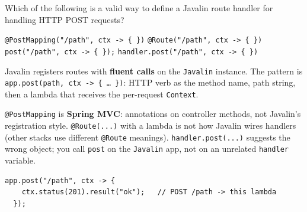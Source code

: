 \question[4]
Which of the following is a valid way to define a Javalin route handler for handling HTTP POST requests?
\begin{choices}
  \choice \texttt{@PostMapping("/path", ctx -> \{ \})}
  \choice \texttt{@Route("/path", ctx -> \{ \})}
  \CorrectChoice \texttt{post("/path", ctx -> \{ \});}
  \choice \texttt{handler.post("/path", ctx -> \{ \})}
\end{choices}
\begin{solution}
  Javalin registers routes with \textbf{fluent calls} on the \texttt{Javalin} instance. 
  The pattern is \texttt{app.post(path, ctx -> \{ \ldots\ \})}: HTTP verb as the method name, 
  path string, then a lambda that receives the per-request \texttt{Context}. 

  \texttt{@PostMapping} is \textbf{Spring MVC}: annotations on controller methods, not Javalin's registration style. \texttt{@Route(...)} with a lambda is not how Javalin wires handlers (other stacks use different \texttt{@Route} meanings). \texttt{handler.post(...)} suggests the wrong object; you call \texttt{post} on the \texttt{Javalin} app, not on an unrelated \texttt{handler} variable.

  \begin{lstlisting}[style=java]
  app.post("/path", ctx -> {
    ctx.status(201).result("ok");   // POST /path -> this lambda
  });
  \end{lstlisting}
\end{solution}

\newpage

